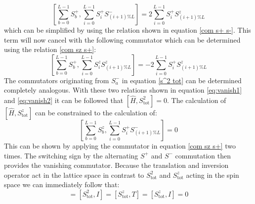 \documentclass{scrartcl}
\begin{document}
\begin{equation}
    \left[ \sum ^{L-1}_{b=0} S^{+}_b,\sum ^{L-1 }_{i=0}  S^{+}_i S^{-}_{(i+1)\%L}\right]= 2 \sum ^{L-1 }_{i=0}  S^{+}_i S^{z}_{(i+1)\%L}
    \label{eq:vanish1}
\end{equation}
which can be simplified by using the relation shown in equation \ref{com s+ s-}. This term will now cancel with the following commutator which can be determined using the relation \ref{com sz s+}:
\begin{equation}
    \left[ \sum ^{L-1}_{b=0} S^{+}_b,\sum ^{L-1 }_{i=0}  S^{z}_i S^{z}_{(i+1)\%L}\right]= -2 \sum ^{L-1 }_{i=0}  S^{+}_i S^{z}_{(i+1)\%L}
    \label{eq:vanish2}
\end{equation}
\newpage
\noindent The commutators originating from $S^-_a$ in equation \ref{s^2 tot} can be determined completely analogous. With these two relations shown in equation \ref{eq:vanish1} and \ref{eq:vanish2} it can be followed that $[\hat{H},S^2_{\mathrm{tot}}]=0$. The calculation of $[\hat{H},S^z_{\mathrm{tot}}]$ can be constrained to the calculation of:
\begin{equation}
    \left[ \sum ^{L-1}_{b=0} S^{z}_b,\sum ^{L-1 }_{i=0}  S^{+}_i S^{-}_{(i+1)\%L}\right]= 0
\end{equation}
This can be shown by applying the commutator in equation \ref{com sz s+} two times. The switching sign by the alternating $S^+$ and $S^-$ commutation then provides the vanishing commutator. Because the translation and inversion operator act in the lattice space in contrast to $S^2_{\mathrm{tot}}$ and $S^z_{\mathrm{tot}}$ acting in the spin space we can immediately follow that:
\begin{equation*}
    [S^2_{\mathrm{tot}},T]=[S^2_{\mathrm{tot}},I]=[S^z_{\mathrm{tot}},T]=[S^z_{\mathrm{tot}},I]=0
\end{equation*}
\end{document}
